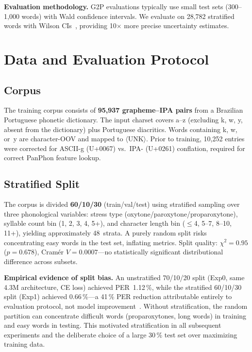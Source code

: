 \documentclass[conference]{IEEEtran}
\begin{document}
\textbf{Evaluation methodology.}
G2P evaluations typically use small test sets (300--1{,}000 words)
with Wald confidence intervals.
We evaluate on 28{,}782 stratified words with Wilson
CIs~\cite{wilson1927probable}, providing 10$\times$ more precise
uncertainty estimates.

\section{Data and Evaluation Protocol}
\label{sec:data}

\subsection{Corpus}

The training corpus consists of \textbf{95{,}937 grapheme--IPA pairs}
from a Brazilian Portuguese phonetic dictionary.
The input charset covers a--z (excluding k, w, y, absent from the
dictionary) plus Portuguese diacritics.
Words containing k, w, or~y are character-OOV and mapped to
$\langle$UNK$\rangle$.
Prior to training, 10{,}252 entries were corrected for ASCII-g
(U+0067) vs.\ IPA- (U+0261) conflation, required for
correct PanPhon feature lookup.

\subsection{Stratified Split}

The corpus is divided \textbf{60/10/30} (train/val/test) using
stratified sampling over three phonological variables: stress type
(oxy\-tone/paroxytone/proparoxytone), syllable count bin
(1, 2, 3, 4, 5+), and character length bin
($\leq$4, 5--7, 8--10, 11+), yielding approximately 48~strata.
A purely random split risks concentrating easy words in the test set,
inflating metrics.
Split quality: $\chi^2\!=\!0.95$ ($p\!=\!0.678$),
Cram\'{e}r $V\!=\!0.0007$---no statistically significant
distributional difference across subsets.

\textbf{Empirical evidence of split bias.}
An unstratified 70/10/20 split (Exp0, same 4.3M architecture, CE
loss) achieved PER~1.12\,\%, while the stratified 60/10/30 split
(Exp1) achieved 0.66\,\%---a 41\,\% PER reduction attributable
entirely to evaluation protocol, not model
improvement~\cite{kohavi1995crossvalidation}.
Without stratification, the random partition can concentrate difficult
words (proparoxytones, long words) in training and easy words in
testing.
This motivated stratification in all subsequent experiments and the
deliberate choice of a large 30\,\% test set over maximizing
training data.
\end{document}

